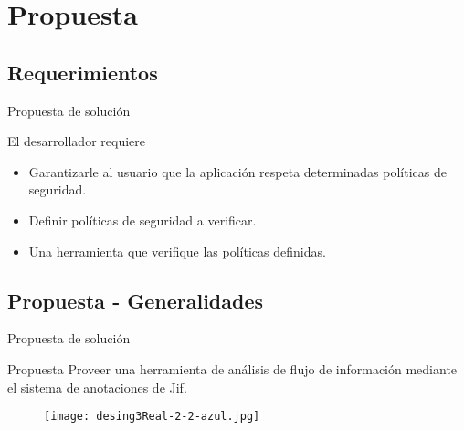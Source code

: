  \section{Propuesta}
\subsection{Requerimientos}
\begin{frame}{Propuesta de solución}
	\begin{block}{El desarrollador requiere}
		\begin{itemize}
		  \item Garantizarle al usuario que la aplicación respeta determinadas
		  políticas de seguridad.
		  \item Definir políticas de seguridad a verificar.
		  \item Una herramienta que verifique las políticas definidas.
		\end{itemize}
	\end{block}
\end{frame}

\subsection{Propuesta - Generalidades}
\begin{frame}{Propuesta de solución}
	\begin{block}{Propuesta}
		  Proveer una herramienta de análisis de flujo de información mediante el
		  sistema de anotaciones de Jif.
	\end{block}
	\begin{figure}[t!]
		\begin{center} 
		\texttt{[image: desing3Real-2-2-azul.jpg]} 
		\end{center}
	\end{figure}
\end{frame}

